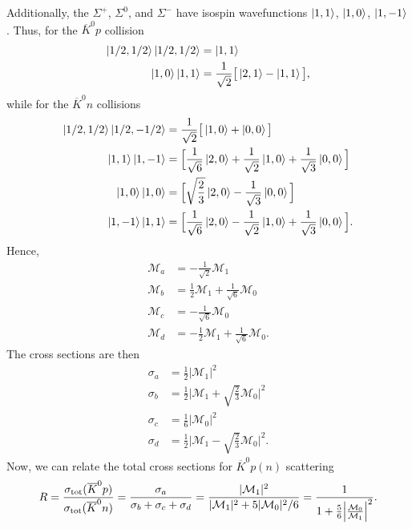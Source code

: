 Additionally, the $\Sigma^{+}$, $\Sigma^{0}$, and $\Sigma^{-}$ have isospin wavefunctions $\ket{1,1}$, $\ket{1,0}$, $\ket{1,-1}$.
Thus, for the $\overline{K}^{0}p$ collision
\begin{align}
    \label{eq:rxn1}
    \ket{1/2,1/2}\ket{1/2,1/2} &= \ket{1,1} \\
    \ket{1,0}\ket{1,1} &= \frac{1}{\sqrt{2}}\big[ \ket{2,1} - \ket{1,1} \big]
,\end{align}
while for the $\overline{K}^{0}n$ collisions
\begin{align}
    \label{eq:rxn2-4}
    \ket{1/2,1/2}\ket{1/2,-1/2} &= \frac{1}{\sqrt{2}}\big[ \ket{1,0} + \ket{0,0} \big] \\
    \ket{1,1}\ket{1,-1} &= \Big[ \frac{1}{\sqrt{6}}\ket{2,0} + \frac{1}{\sqrt{2}}\ket{1,0} + \frac{1}{\sqrt{3}}\ket{0,0} \Big] \\
    \ket{1,0}\ket{1,0} &= \Big[ \sqrt{\frac{2}{3}}\ket{2,0} - \frac{1}{\sqrt{3}}\ket{0,0} \Big] \\
    \ket{1,-1}\ket{1,1} &= \Big[ \frac{1}{\sqrt{6}}\ket{2,0} - \frac{1}{\sqrt{2}}\ket{1,0} + \frac{1}{\sqrt{3}}\ket{0,0} \Big]
.\end{align}
Hence, 
\begin{align}
    \label{eq:amplitude-relations}
    \mathcal{M}_{a} &= -\frac{1}{\sqrt{2}}\mathcal{M}_{1} \\
    \mathcal{M}_{b} &= \frac{1}{2}\mathcal{M}_{1} + \frac{1}{\sqrt{6}}\mathcal{M}_{0} \\
    \mathcal{M}_{c} &= -\frac{1}{\sqrt{6}}\mathcal{M}_{0} \\
    \mathcal{M}_{d} &= -\frac{1}{2}\mathcal{M}_{1} + \frac{1}{\sqrt{6}}\mathcal{M}_{0}
.\end{align}
The cross sections are then
\begin{align}
    \label{eq:cs-from-amps}
    \sigma_{a} &= \frac{1}{2}|\mathcal{M}_{1}|^2 \\
    \sigma_{b} &= \frac{1}{2} \Big| \mathcal{M}_{1} + \sqrt{\frac{2}{3}}\mathcal{M}_{0} \Big|^2 \\
    \sigma_{c} &= \frac{1}{6}|\mathcal{M}_{0}|^2 \\
    \sigma_{d} &= \frac{1}{2} \Big| \mathcal{M}_{1} - \sqrt{\frac{2}{3}}\mathcal{M}_{0} \Big|^2
.\end{align}
Now, we can relate the total cross sections for $\overline{K}^{0}p(n)$ scattering
\begin{eqnarray}
    \label{eq:total-cs}
    R = \frac{\sigma_{\rm tot}(\overline{K}^{0}p)}{\sigma_{\rm tot}(\overline{K}^{0}n)} = \frac{\sigma_{a}}{\sigma_{b} + \sigma_{c} + \sigma_{d}} = \frac{|\mathcal{M}_{1}|^2}{|\mathcal{M}_{1}|^2 + 5|\mathcal{M}_{0}|^2/6} = \frac{1}{1 + \frac{5}{6}\Big| \frac{\mathcal{M}_{0}}{\mathcal{M}_{1}} \Big|^2}
.\end{eqnarray}


